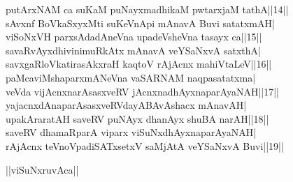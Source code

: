\documentclass{article}
\begin{document}
putArxNAM ca suKaM puNayxmadhikaM pwtarxjaM tathA||14||\\
sAvxnf BoVkaSxyxMti suKeVnApi mAnavA Buvi satatxmAH|\\
viSoNxVH parxsAdadAneVna upadeVsheVna tasayx ca||15||\\
savaRvAyxdhivinimuRkAtx mAnavA veYSaNxvA satxthA|\\
savxgaRloVkatirasAkxraH kaqtoV rAjAcnx mahiVtaLeV||16||\\
paMcaviMshaparxmANeVna vaSARNAM naqpasatatxma|\\
veVda vijAcnxnarAsasxveRV jAcnxnadhAyxnaparAyaNAH||17||\\
yajacnxdAnaparAsasxveRVdayABAvAshacx mAnavAH|\\
upakAraratAH saveRV puNAyx dhanAyx shuBA narAH||18||\\
saveRV dhamaRparA viparx viSuNxdhAyxnaparAyaNAH|\\
rAjAcnx teVnoVpadiSATxsetxV saMjAtA veYSaNxvA Buvi||19||\\

\begin{center}
||viSuNxruvAca||
\end{center}
\end{document}
